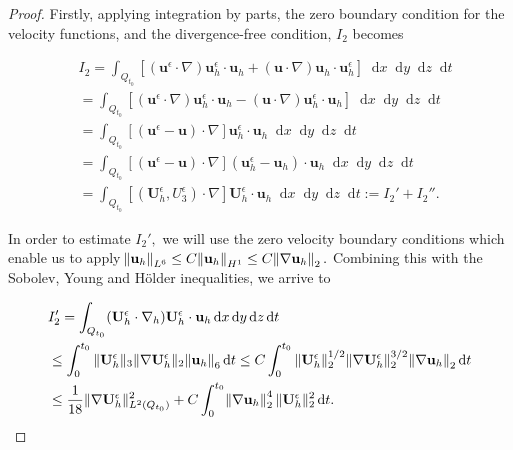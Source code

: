 \documentclass[11pt]{article}
\newcommand*\diff{\mathop{}\!\mathrm{d}}
\begin{document}
\begin{proof}
  Firstly, applying integration by parts, the zero boundary condition for the velocity functions, and the divergence-free condition, $I_2$ becomes
  
  \begin{equation}
    \begin{split}
      & I_2 = \int_{Q_{t_0}} [(\mathbf{u}^\epsilon \cdot \nabla) \mathbf{u}_h^\epsilon \cdot \mathbf{u}_h + (\mathbf{u} \cdot \nabla )\mathbf{u}_h \cdot \mathbf{u}_h^\epsilon] \diff x \diff y \diff z \diff t \\
      & = \int_{Q_{t_0}} [(\mathbf{u}^\epsilon \cdot \nabla) \mathbf{u}_h^\epsilon \cdot \mathbf{u}_h - (\mathbf{u} \cdot \nabla )\mathbf{u}^\epsilon_h \cdot \mathbf{u}_h] \diff x \diff y \diff z \diff t \\
      & = \int_{Q_{t_0}} [(\mathbf{u}^\epsilon - \mathbf{u}) \cdot \nabla ] \mathbf{u}_h^\epsilon \cdot \mathbf{u}_h  \diff x \diff y \diff z \diff t \\
      & = \int_{Q_{t_0}} [(\mathbf{u}^\epsilon - \mathbf{u}) \cdot \nabla ] (\mathbf{u}_h^\epsilon - \mathbf{u}_h) \cdot \mathbf{u}_h  \diff x \diff y \diff z \diff t \\
      & = \int_{Q_{t_0}} [(\mathbf{U}_h^\epsilon, U^\epsilon_3) \cdot \nabla ] \mathbf{U}_h^\epsilon \cdot \mathbf{u}_h  \diff x \diff y \diff z \diff t := I_2' + I_2''.
    \end{split}
  \end{equation}
  
  In order to estimate $I_2',$ we will use the zero velocity boundary conditions which enable us to apply $\norm{\mathbf{u}_h}_{L^6} \leq C \norm{\mathbf{u}_h}_{H^1} \leq C \norm{\nabla \mathbf{u}_h}_2.$ Combining this with the Sobolev, Young and H\"older inequalities, we arrive to
  
  \begin{equation} \label{I_2_prime}
    \begin{split}
      & I_2'= \int_{Q_{t_0}} (\mathbf{U}^\epsilon_h \cdot \nabla_h) \mathbf{U}^\epsilon_h \cdot \mathbf{u}_h \diff x \diff y \diff z \diff t \\
      & \leq \int_0^{t_0} \| \mathbf{U}^\epsilon_h \| _3 \| \nabla \mathbf{U}^\epsilon_h \| _2 \norm{\mathbf{u}_h}_6 \diff t \leq C \int_0^{t_0} \| \mathbf{U}^\epsilon_h \| _2^{1/2} \| \nabla \mathbf{U}^\epsilon_h \|_2^{3/2} \norm{\nabla \mathbf{u}_h}_2 \diff t \\
      & \leq \frac{1}{18} \| \nabla \mathbf{U}^\epsilon_h \| ^2_{L^2(Q_{t_0})} + C \int_0^{t_0} \norm{\nabla \mathbf{u}_h}_2^4 \| \mathbf{U}^\epsilon_h \| _2^2 \diff t.
    \end{split}
  \end{equation}
  

\end{proof}
\end{document}
